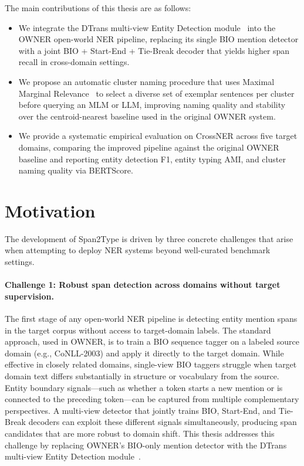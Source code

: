 \documentclass[14pt]{extreport}
\begin{document}
The main contributions of this thesis are as follows:

\begin{itemize}
    \item We integrate the DTrans multi-view Entity Detection module~\cite{zhang-etal-2024-dtrans} into the OWNER open-world NER pipeline, replacing its single BIO mention detector with a joint BIO + Start-End + Tie-Break decoder that yields higher span recall in cross-domain settings.
    \item We propose an automatic cluster naming procedure that uses Maximal Marginal Relevance~\cite{carbonell-goldstein-1998-use} to select a diverse set of exemplar sentences per cluster before querying an MLM or LLM, improving naming quality and stability over the centroid-nearest baseline used in the original OWNER system.
    \item We provide a systematic empirical evaluation on CrossNER across five target domains, comparing the improved pipeline against the original OWNER baseline and reporting entity detection F1, entity typing AMI, and cluster naming quality via BERTScore.
\end{itemize}


\section{Motivation} \label{sec:Challenges}

The development of Span2Type is driven by three concrete challenges that arise when attempting to deploy NER systems beyond well-curated benchmark settings.

\paragraph{Challenge 1: Robust span detection across domains without target supervision.}
The first stage of any open-world NER pipeline is detecting entity mention spans in the target corpus without access to target-domain labels. The standard approach, used in OWNER, is to train a BIO sequence tagger on a labeled source domain (e.g., CoNLL-2003) and apply it directly to the target domain. While effective in closely related domains, single-view BIO taggers struggle when target domain text differs substantially in structure or vocabulary from the source. Entity boundary signals---such as whether a token starts a new mention or is connected to the preceding token---can be captured from multiple complementary perspectives. A multi-view detector that jointly trains BIO, Start-End, and Tie-Break decoders can exploit these different signals simultaneously, producing span candidates that are more robust to domain shift. This thesis addresses this challenge by replacing OWNER's BIO-only mention detector with the DTrans multi-view Entity Detection module~\cite{zhang-etal-2024-dtrans}.
\end{document}
